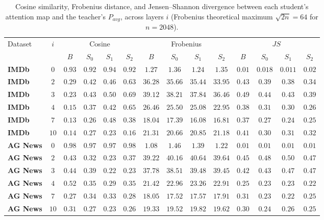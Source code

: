 \documentclass[conference]{IEEEtran}
\begin{document}
\begin{table}[tb]
\centering
\caption{Cosine similarity, Frobenius distance, and Jensen--Shannon divergence between each student's attention map and the teacher's $P_{avg}$, across layers $i$ (Frobenius theoretical maximum $\sqrt{2n}=64$ for $n=2048$).}
\footnotesize
\begin{tabular}{|l|c|c|c|c|c|c|c|c|c|c|c|c|c|}
\hline
\multirow{2}{*}{Dataset} & \multirow{2}{*}{$i$} & \multicolumn{4}{c|}{Cosine} & \multicolumn{4}{c|}{Frobenius} & \multicolumn{4}{c|}{$JS$} \\
\cline{3-14}
 & & $B$ & $S_0$ & $S_1$ & $S_2$ & $B$ & $S_0$ & $S_1$ & $S_2$ & $B$ & $S_0$ & $S_1$ & $S_2$ \\ \hline
\textbf{IMDb} & $0$ & $0.93$ & $0.92$ & $0.94$ & $0.92$ & $1.27$ & $1.36$ & $1.24$ & $1.35$ & $0.01$ & $0.018$ & $0.011$ & $0.02$ \\
\textbf{IMDb} & $2$ & $0.29$ & $0.42$ & $0.46$ & $0.63$ & $36.28$ & $35.66$ & $35.44$ & $33.95$ & $0.43$ & $0.39$ & $0.38$ & $0.34$ \\
\textbf{IMDb} & $3$ & $0.23$ & $0.43$ & $0.50$ & $0.69$ & $39.12$ & $38.21$ & $37.84$ & $36.46$ & $0.49$ & $0.44$ & $0.43$ & $0.39$ \\
\textbf{IMDb} & $4$ & $0.15$ & $0.37$ & $0.42$ & $0.65$ & $26.46$ & $25.50$ & $25.08$ & $22.95$ & $0.38$ & $0.31$ & $0.30$ & $0.26$ \\
\textbf{IMDb} & $7$ & $0.13$ & $0.26$ & $0.48$ & $0.38$ & $18.04$ & $17.39$ & $16.08$ & $16.81$ & $0.37$ & $0.27$ & $0.24$ & $0.25$ \\
\textbf{IMDb} & $10$ & $0.14$ & $0.27$ & $0.23$ & $0.16$ & $21.31$ & $20.66$ & $20.85$ & $21.18$ & $0.41$ & $0.30$ & $0.31$ & $0.32$ \\
\hline
\textbf{AG News} & $0$ & $0.98$ & $0.97$ & $0.97$ & $0.98$ & $1.08$ & $1.46$ & $1.39$ & $1.22$ & $0.01$ & $0.01$ & $0.01$ & $0.01$ \\
\textbf{AG News} & $2$ & $0.43$ & $0.32$ & $0.23$ & $0.37$ & $39.22$ & $40.16$ & $40.64$ & $39.64$ & $0.45$ & $0.48$ & $0.50$ & $0.47$ \\
\textbf{AG News} & $3$ & $0.44$ & $0.39$ & $0.22$ & $0.23$ & $37.78$ & $38.51$ & $39.48$ & $39.45$ & $0.42$ & $0.43$ & $0.47$ & $0.47$ \\
\textbf{AG News} & $4$ & $0.52$ & $0.35$ & $0.29$ & $0.35$ & $21.42$ & $22.96$ & $23.26$ & $22.91$ & $0.25$ & $0.23$ & $0.23$ & $0.22$ \\
\textbf{AG News} & $7$ & $0.27$ & $0.34$ & $0.33$ & $0.28$ & $18.05$ & $17.52$ & $17.57$ & $17.91$ & $0.31$ & $0.23$ & $0.22$ & $0.25$ \\
\textbf{AG News} & $10$ & $0.31$ & $0.27$ & $0.23$ & $0.26$ & $19.33$ & $19.52$ & $19.82$ & $19.62$ & $0.30$ & $0.24$ & $0.26$ & $0.25$ \\ \hline
\end{tabular}
\label{tab:repr_metrics}
\end{table}
\end{document}
